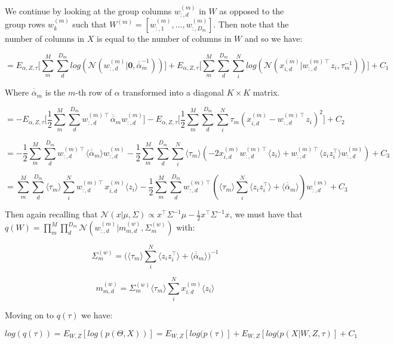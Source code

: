 \documentclass{article}
\begin{document}
We continue by looking at the group columns $w_{:,d}^{(m)}$ in $W$ as opposed to the group rows $w_k^{(m)}$ such that $W^{(m)} = [w_{:,1}^{(m)},...,w_{:,D_m}^{(m)}]$. Then note that the number of columns in $X$ is equal to the number of columns in $W$ and so we have:

$$=E_{\alpha,Z,\tau}\bigg[\sum_{m}^M{\sum_{d}^{D_m}{log(\mathcal{N}(w_{:,d}^{(m)}|\textbf{0}, \overline{\overline{\alpha}}_m^{-1}))}}\bigg] + E_{\alpha,Z,\tau}\bigg[\sum_m^M{\sum_d^{D_m}{\sum_i^N{log(\mathcal{N}(x_{i,d}^{(m)}|w_{:,d}^{(m)\intercal}z_i, \tau_m^{-1}))}}}\bigg] + C_1$$

Where $\overline{\overline{\alpha}}_m$ is the $m$-th row of $\alpha$ transformed into a diagonal $K\times K$ matrix.

$$ = -E_{\alpha,Z,\tau}\bigg[\frac{1}{2}\sum_m^M{\sum_d^{D_m}{w_{:,d}^{(m)\intercal} \overline{\overline{\alpha}}_m w_{:,d}^{(m)}}}\bigg] - E_{\alpha,Z,\tau}\bigg[\frac{1}{2}\sum_m^M{\sum_d^{D_m}{\sum_i^N{\tau_m(x_{i,d}^{(m)} - w_{:,d}^{(m)\intercal}z_i)^2 }}}\bigg]+C_2$$

$$ = -\frac{1}{2}\sum_m^M{\sum_d^{D_m}{w_{:,d}^{(m)\intercal} \langle\overline{\overline{\alpha}}_m\rangle w_{:,d}^{(m)}}} - \frac{1}{2}\sum_m^M{\sum_d^{D_m}{\sum_i^N{\langle\tau_m\rangle(- 2x_{i,d}^{(m)}w_{:,d}^{(m)\intercal}\langle z_i\rangle + w_{:,d}^{(m)\intercal}\langle z_i z_i^\intercal\rangle  w_{:,d}^{(m)}) }}}+C_3$$

$$ = \sum_m^M{\sum_d^{D_m}{\langle \tau_m \rangle \sum_i^N{w_{:,d}^{(m)\intercal}x_{i,d}^{(m)}\langle z_i\rangle}}} -\frac{1}{2}\sum_m^M{\sum_d^{D_m}{w_{:,d}^{(m)\intercal}(\langle\tau_m \rangle \sum_i^N{\langle z_iz_i^\intercal \rangle} + \langle\overline{\overline{\alpha}}_m\rangle) w_{:,d}^{(m)}}}+C_3$$

Then again recalling that $\mathcal{N}(x|\mu,\Sigma) \propto x^\intercal \Sigma^{-1} \mu - \frac{1}{2} x^\intercal \Sigma^{-1} x$, we must have that $q(W) = \prod_m^M{\prod_d^{D_m}{\mathcal{N}(w_{:,d}^{(m)}|m_{m,d}^{(w)}, \Sigma_m^{(w)})}}$ with:

$$\Sigma_m^{(w)} = \bigg(\langle\tau_m \rangle \sum_i^N{\langle z_iz_i^\intercal \rangle} + \langle\overline{\overline{\alpha}}_m\rangle\bigg)^{-1}$$

$$m_{m,d}^{(w)} = \Sigma_m^{(w)} \langle \tau_m \rangle \sum_i^N{x_{i,d}^{(m)}\langle z_i\rangle}$$

Moving on to $q(\tau)$ we have:

$$log(q(\tau)) = E_{W, Z}[log(p(\Theta,X))] = E_{W, Z}[log(p(\tau)] + E_{W, Z}[log(p(X|W,Z,\tau)] + C_1$$
\end{document}
